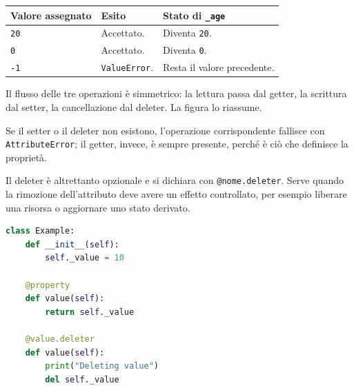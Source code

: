 \documentclass[12pt]{extarticle}
\begin{document}
\begin{center}
\small
\begin{tabular}{p{4.0cm}p{4.6cm}p{5.4cm}}
    \toprule
    \textbf{Valore assegnato} & \textbf{Esito} & \textbf{Stato di \texttt{\_age}} \\
    \midrule
    \texttt{20} & Accettato. & Diventa \texttt{20}. \\
    \addlinespace
    \texttt{0} & Accettato. & Diventa \texttt{0}. \\
    \addlinespace
    \texttt{-1} & \texttt{ValueError}. & Resta il valore precedente. \\
    \bottomrule
\end{tabular}
\end{center}

\noindent Il flusso delle tre operazioni è simmetrico: la lettura passa dal getter, la scrittura dal setter, la cancellazione dal deleter. La figura lo riassume.

\begin{center}
\end{center}

\noindent Se il setter o il deleter non esistono, l'operazione corrispondente fallisce con \texttt{AttributeError}; il getter, invece, è sempre presente, perché è ciò che definisce la proprietà.

\noindent Il deleter è altrettanto opzionale e si dichiara con \texttt{@nome.deleter}. Serve quando la rimozione dell'attributo deve avere un effetto controllato, per esempio liberare una risorsa o aggiornare uno stato derivato.

\begin{lstlisting}[language=Python]
class Example:
    def __init__(self):
        self._value = 10

    @property
    def value(self):
        return self._value

    @value.deleter
    def value(self):
        print("Deleting value")
        del self._value
\end{lstlisting}
\end{document}
